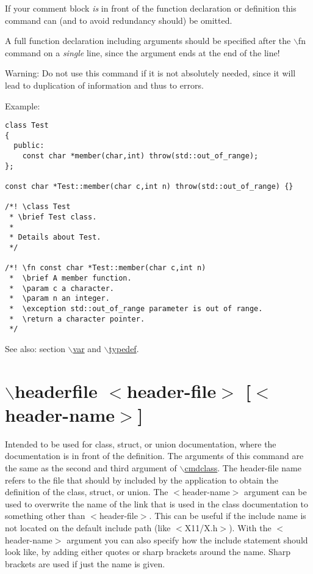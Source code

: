 If your comment block {\em is\/} in front of the function declaration or definition this command can (and to avoid redundancy should) be omitted.

A full function declaration including arguments should be specified after the $\backslash$fn command on a {\em single\/} line, since the argument ends at the end of the line!

\begin{Desc}
\item[Warning:]Do not use this command if it is not absolutely needed, since it will lead to duplication of information and thus to errors.\end{Desc}
\begin{Desc}
\item[Example:]

\begin{VerbInclude}\begin{verbatim}class Test
{
  public:
    const char *member(char,int) throw(std::out_of_range);
};

const char *Test::member(char c,int n) throw(std::out_of_range) {}

/*! \class Test
 * \brief Test class.
 *
 * Details about Test.
 */

/*! \fn const char *Test::member(char c,int n) 
 *  \brief A member function.
 *  \param c a character.
 *  \param n an integer.
 *  \exception std::out_of_range parameter is out of range.
 *  \return a character pointer.
 */
\end{verbatim}
\end{VerbInclude}
 \end{Desc}
\begin{Desc}
\item[See also:]section \hyperlink{commands_cmdvar}{$\backslash$var} and \hyperlink{commands_cmdtypedef}{$\backslash$typedef}.\end{Desc}


 \hypertarget{commands_cmdheaderfile}{}\section{$\backslash$headerfile $<$header-file$>$ \mbox{[}$<$header-name$>$\mbox{]}}\label{commands_cmdheaderfile}
 Intended to be used for class, struct, or union documentation, where the documentation is in front of the definition. The arguments of this command are the same as the second and third argument of \hyperlink{commands_cmdclass}{$\backslash$cmdclass}. The header-file name refers to the file that should by included by the application to obtain the definition of the class, struct, or union. The $<$header-name$>$ argument can be used to overwrite the name of the link that is used in the class documentation to something other than $<$header-file$>$. This can be useful if the include name is not located on the default include path (like $<$X11/X.h$>$). With the $<$header-name$>$ argument you can also specify how the include statement should look like, by adding either quotes or sharp brackets around the name. Sharp brackets are used if just the name is given.



